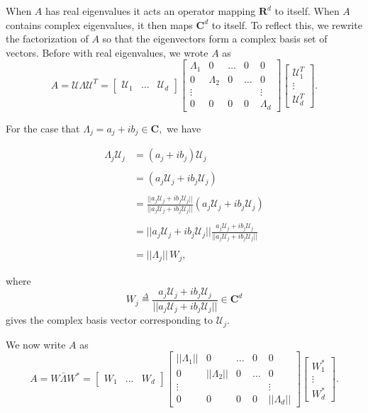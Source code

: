 When $A$ has real eigenvalues it acts an operator mapping $\mathbf{R}^{d}$ to itself.  When $A$ contains complex eigenvalues, it then maps $\mathbf{C}^{d}$ to itself. To reflect this, we rewrite the factorization of $A$ so that the eigenvectors form a complex basis set of vectors. Before with real eigenvalues, we wrote $A$ as 
$$
A = \mathcal{U} \Lambda \mathcal{U}^T = 
\begin{bmatrix}
\mathcal{U}_1 & \hdots  & \mathcal{U}_d
\end{bmatrix}
\begin{bmatrix}
\Lambda_1 & 0 & \hdots &0  & 0
\\
0 & \Lambda_2 & 0 & \hdots & 0
\\
\vdots & & & & \vdots
\\
 0& 0  & 0 & 0 & \Lambda_d
 \end{bmatrix}
 \begin{bmatrix}
\mathcal{U}_1^T \\ \vdots  \\ \mathcal{U}_d^T
\end{bmatrix}.
$$

For the case that $\Lambda_j = a_j + ib_j \in \mathbf{C},$ we have

\begin{align*}
\Lambda_j \mathcal{U}_j 
&=
\left(a_j + ib_j\right) \mathcal{U}_j
\\
\\
&= 
\left(a_j \mathcal{U}_j + ib_j \mathcal{U}_j\right)
\\
\\
&=
\frac{||a_j \mathcal{U}_j + ib_j \mathcal{U}_j||}
{||a_j \mathcal{U}_j + ib_j \mathcal{U}_j||}
\left(a_j \mathcal{U}_j + ib_j \mathcal{U}_j\right)
\\
\\
&= 
||a_j \mathcal{U}_j + ib_j \mathcal{U}_j||
\frac
{a_j \mathcal{U}_j + ib_j \mathcal{U}_j}
{||a_j \mathcal{U}_j + ib_j \mathcal{U}_j||}
\\
\\
&=
||\Lambda_j|| \, W_j,
\end{align*}

where 
$$ W_j \overset{\Delta}{=} \frac
{a_j \mathcal{U}_j + ib_j \mathcal{U}_j}
{||a_j \mathcal{U}_j + ib_j \mathcal{U}_j||} \in \mathbf{C}^d
$$
gives the complex basis vector corresponding to $\mathcal{U}_j$.

We now write $A$ as 
$$
A = 
W \bar{\Lambda} W^*
=
\begin{bmatrix}
W_1 & \hdots  & W_d
\end{bmatrix}
\begin{bmatrix}
||\Lambda_1|| & 0 & \hdots &0  & 0
\\
0 & ||\Lambda_2|| & 0 & \hdots & 0
\\
\vdots & & & & \vdots
\\
 0& 0  & 0 & 0 & ||\Lambda_d||
 \end{bmatrix}
 \begin{bmatrix}
W_1^* \\ \vdots  \\ W_d^*
\end{bmatrix}.
$$

